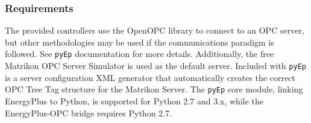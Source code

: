 \subsubsection{Requirements}

The provided controllers use the OpenOPC library to connect to an OPC server, but other methodologies may be used if the communications paradigm is followed. See \texttt{pyEp} documentation for more details.
Additionally, the free Matrikon OPC Server Simulator is used as the default server.
Included with \texttt{pyEp} is a server configuration XML generator that automatically creates the correct OPC Tree Tag structure for the Matrikon Server. 
The \texttt{pyEp} core module, linking EnergyPlus to Python, is supported for Python 2.7 and 3.x, while the EnergyPlus-OPC bridge requires Python 2.7.

